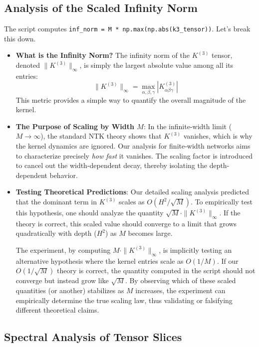 \documentclass[11pt,a4paper]{article}
\begin{document}
\subsection{Analysis of the Scaled Infinity Norm}

The script computes \texttt{inf\_norm = M * np.max(np.abs(k3\_tensor))}. Let's break this down.

\begin{itemize}
    \item \textbf{What is the Infinity Norm?} The infinity norm of the $K^{(3)}$ tensor, denoted $\|K^{(3)}\|_\infty$, is simply the largest absolute value among all its entries:
    \[ \|K^{(3)}\|_\infty = \max_{\alpha, \beta, \gamma} |K^{(3)}_{\alpha\beta\gamma}| \]
    This metric provides a simple way to quantify the overall magnitude of the kernel.

    \item \textbf{The Purpose of Scaling by Width $M$}: In the infinite-width limit ($M \to \infty$), the standard NTK theory shows that $K^{(3)}$ vanishes, which is why the kernel dynamics are ignored. Our analysis for finite-width networks aims to characterize precisely \textit{how fast} it vanishes. The scaling factor is introduced to cancel out the width-dependent decay, thereby isolating the depth-dependent behavior.

    \item \textbf{Testing Theoretical Predictions}: Our detailed scaling analysis predicted that the dominant term in $K^{(3)}$ scales as $O(H^2/\sqrt{M})$. To empirically test this hypothesis, one should analyze the quantity $\sqrt{M} \cdot \|K^{(3)}\|_\infty$. If the theory is correct, this scaled value should converge to a limit that grows quadratically with depth ($H^2$) as $M$ becomes large.

    The experiment, by computing $M \cdot \|K^{(3)}\|_\infty$, is implicitly testing an alternative hypothesis where the kernel entries scale as $O(1/M)$. If our $O(1/\sqrt{M})$ theory is correct, the quantity computed in the script should not converge but instead grow like $\sqrt{M}$. By observing which of these scaled quantities (or another) stabilizes as $M$ increases, the experiment can empirically determine the true scaling law, thus validating or falsifying different theoretical claims.
\end{itemize}

\subsection{Spectral Analysis of Tensor Slices}
\end{document}
